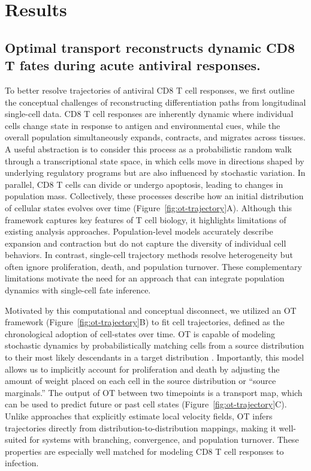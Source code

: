 \section{Results}

\subsection{Optimal transport reconstructs dynamic CD8 T fates during acute antiviral responses. }

To better resolve trajectories of antiviral CD8 T cell responses, we first outline the conceptual challenges of reconstructing differentiation paths from longitudinal single-cell data. CD8 T cell responses are inherently dynamic where individual cells change state in response to antigen and environmental cues, while the overall population simultaneously expands, contracts, and migrates across tissues. A useful abstraction is to consider this process as a probabilistic random walk through a transcriptional state space, in which cells move in directions shaped by underlying regulatory programs but are also influenced by stochastic variation. In parallel, CD8 T cells can divide or undergo apoptosis, leading to changes in population mass. Collectively, these processes describe how an initial distribution of cellular states evolves over time (Figure~\ref{fig:ot-trajectory}A). Although this framework captures key features of T cell biology, it highlights limitations of existing analysis approaches. Population-level models accurately describe expansion and contraction but do not capture the diversity of individual cell behaviors. In contrast, single-cell trajectory methods resolve heterogeneity but often ignore proliferation, death, and population turnover. These complementary limitations motivate the need for an approach that can integrate population dynamics with single-cell fate inference.

Motivated by this computational and conceptual disconnect, we utilized an OT framework (Figure~\ref{fig:ot-trajectory}B) to fit cell trajectories, defined as the chronological adoption of cell-states over time. OT is capable of modeling stochastic dynamics by probabilistically matching cells from a source distribution to their most likely descendants in a target distribution \citep{bunneProximalOptimalTransport2022, parisetUnbalancedDiffusionSchrodinger2023, schiebingerOptimalTransportAnalysisSingleCell2019}. Importantly, this model allows us to implicitly account for proliferation and death by adjusting the amount of weight placed on each cell in the source distribution or ``source marginals.'' The output of OT between two timepoints is a transport map, which can be used to predict future or past cell states (Figure~\ref{fig:ot-trajectory}C). Unlike approaches that explicitly estimate local velocity fields, OT infers trajectories directly from distribution-to-distribution mappings, making it well-suited for systems with branching, convergence, and population turnover. These properties are especially well matched for modeling CD8 T cell responses to infection.

